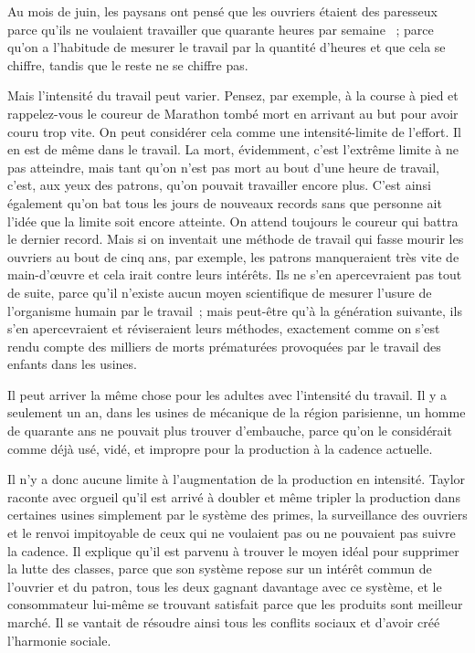 \documentclass[french,twoside]{book} %
\begin{document}
Au mois de juin, les paysans ont pensé que les ouvriers étaient des paresseux parce qu'ils ne voulaient travailler que quarante heures par semaine  ; parce qu'on a l'habitude de mesurer le travail par la quantité d'heures et que cela se chiffre, tandis que le reste ne se chiffre pas.\par
Mais l'intensité du travail peut varier. Pensez, par exemple, à la course à pied et rappelez-vous le coureur de Marathon tombé mort en arrivant au but pour avoir couru trop vite. On peut considérer cela comme une intensité-limite de l'effort. Il en est de même dans le travail. La mort, évidemment, c'est l'extrême limite à ne pas atteindre, mais tant qu'on n'est pas mort au bout d'une heure de travail, c'est, aux yeux des patrons, qu'on pouvait travailler encore plus. C'est ainsi également qu'on bat tous les jours de nouveaux records sans que personne ait l'idée que la limite soit encore atteinte. On attend toujours le coureur qui battra le dernier record. Mais si on inventait une méthode de travail qui fasse mourir les ouvriers au bout de cinq ans, par exemple, les patrons manqueraient très vite de main-d'œuvre et cela irait contre leurs intérêts. Ils ne s'en apercevraient pas tout de suite, parce qu'il n'existe aucun moyen scientifique de mesurer l'usure de l'organisme humain par le travail ; mais peut-être qu'à la génération suivante, ils s'en apercevraient et réviseraient leurs méthodes, exactement comme on s'est rendu compte des milliers de morts prématurées provoquées par le travail des enfants dans les usines.\par
Il peut arriver la même chose pour les adultes avec l'intensité du travail. Il y a seulement un an, dans les usines de mécanique de la région parisienne, un homme de quarante ans ne pouvait plus trouver d'embauche, parce qu'on le considérait comme déjà usé, vidé, et impropre pour la production à la cadence actuelle.\par
Il n'y a donc aucune limite à l'augmentation de la production en intensité. Taylor raconte avec orgueil qu'il est arrivé à doubler et même tripler la production dans certaines usines simplement par le système des primes, la surveillance des ouvriers et le renvoi impitoyable de ceux qui ne voulaient pas ou ne pouvaient pas suivre la cadence. Il explique qu'il est parvenu à trouver le moyen idéal pour supprimer la lutte des classes, parce que son système repose sur un intérêt commun de l'ouvrier et du patron, tous les deux gagnant davantage avec ce système, et le consommateur lui-même se trouvant satisfait parce que les produits sont meilleur marché. Il se vantait de résoudre ainsi tous les conflits sociaux et d'avoir créé l'harmonie sociale.\par
\end{document}
